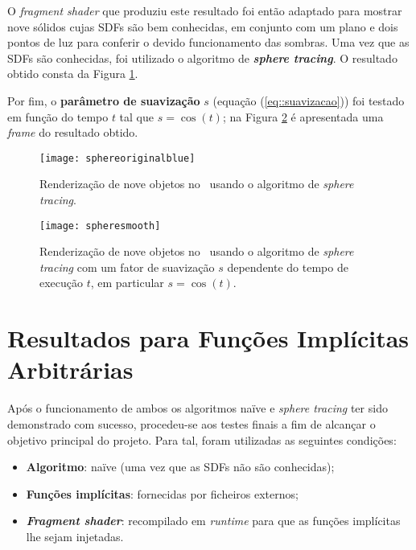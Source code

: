 O \textit{fragment shader} que produziu este resultado foi então adaptado para mostrar nove sólidos cujas \acfp{SDF} são bem conhecidas, em conjunto com um plano e dois pontos de luz para conferir o devido funcionamento das sombras. Uma vez que as \acsp{SDF} são conhecidas, foi utilizado o algoritmo de \textbf{\itshape sphere tracing}. O resultado obtido consta da Figura \ref{fig::sphereoriginalblue}.

Por fim, o \textbf{parâmetro de suavização} $s$ (equação (\ref{eq::suavizacao})) foi testado em função do tempo $t$ tal que $s = \cos(t)$; na Figura \ref{fig::spheresmooth} é apresentada uma \textit{frame} do resultado obtido.

\begin{figure}[!htbp]
	\centering
	\texttt{[image: sphereoriginalblue]}
	\caption[Nove objetos com \textit{sphere tracing} no \theapp]{Renderização de nove objetos no \theapp~usando o algoritmo de \textit{sphere tracing}.}
	\label{fig::sphereoriginalblue}
\end{figure}

\begin{figure}[!htbp]
	\centering
	\texttt{[image: spheresmooth]}
	\caption[Nove objetos com \textit{sphere tracing} e suavização no \theapp]{Renderização de nove objetos no \theapp~usando o algoritmo de \textit{sphere tracing} com um fator de suavização $s$ dependente do tempo de execução $t$, em particular $s = \cos(t)$.}
	\label{fig::spheresmooth}
\end{figure}


\section{Resultados para Funções Implícitas Arbitrárias}
\label{sec::testes:resultados}

Após o funcionamento de ambos os algoritmos naïve e \textit{sphere tracing} ter sido demonstrado com sucesso, procedeu-se aos testes finais a fim de alcançar o objetivo principal do projeto. Para tal, foram utilizadas as seguintes condições:

\begin{itemize}
	\item \textbf{Algoritmo}: naïve (uma vez que as \acsp{SDF} não são conhecidas);
	\item \textbf{Funções implícitas}: fornecidas por ficheiros externos;
	\item \textbf{\itshape Fragment shader}: recompilado em \textit{runtime} para que as funções implícitas lhe sejam injetadas.
\end{itemize}


